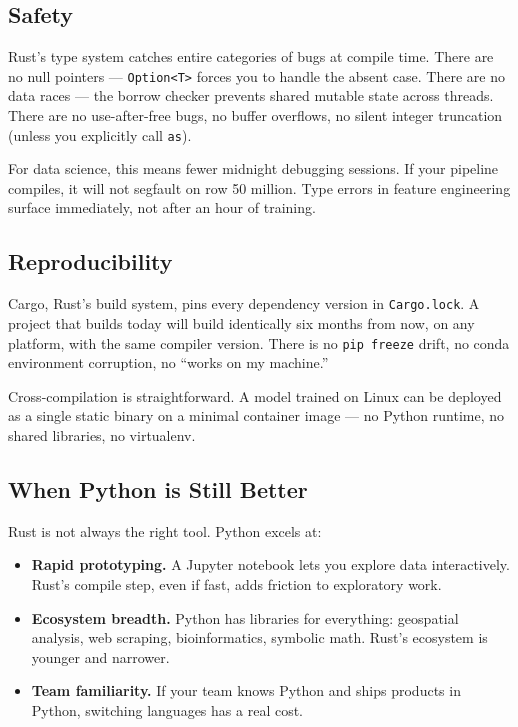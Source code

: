 \subsection{Safety}

Rust's type system catches entire categories of bugs at compile time. There are
no null pointers --- \texttt{Option<T>} forces you to handle the absent case. There
are no data races --- the borrow checker prevents shared mutable state across
threads. There are no use-after-free bugs, no buffer overflows, no silent integer
truncation (unless you explicitly call \texttt{as}).

For data science, this means fewer midnight debugging sessions. If your pipeline
compiles, it will not segfault on row 50 million. Type errors in feature
engineering surface immediately, not after an hour of training.

\subsection{Reproducibility}

Cargo, Rust's build system, pins every dependency version in \texttt{Cargo.lock}.
A project that builds today will build identically six months from now, on any
platform, with the same compiler version. There is no \texttt{pip freeze} drift,
no conda environment corruption, no ``works on my machine.''

Cross-compilation is straightforward. A model trained on Linux can be deployed as
a single static binary on a minimal container image --- no Python runtime, no
shared libraries, no virtualenv.

\subsection{When Python is Still Better}

Rust is not always the right tool. Python excels at:

\begin{itemize}
  \item \textbf{Rapid prototyping.} A Jupyter notebook lets you explore data
    interactively. Rust's compile step, even if fast, adds friction to
    exploratory work.
  \item \textbf{Ecosystem breadth.} Python has libraries for everything:
    geospatial analysis, web scraping, bioinformatics, symbolic math. Rust's
    ecosystem is younger and narrower.
  \item \textbf{Team familiarity.} If your team knows Python and ships products
    in Python, switching languages has a real cost.
\end{itemize}

